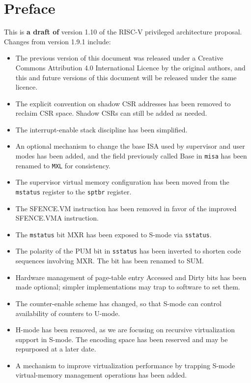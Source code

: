 \chapter{Preface}

This is {\bf a draft of} version 1.10 of the RISC-V privileged
architecture proposal.  Changes from version 1.9.1 include:

\begin{itemize}
  \parskip 0pt
  \itemsep 1pt
\item The previous version of this document was released under a
  Creative Commons Attribution 4.0 International Licence by the
  original authors, and this and future versions of this document will
  be released under the same licence.
\item The explicit convention on shadow CSR addresses has been removed to
  reclaim CSR space.  Shadow CSRs can still be added as needed.
\item The interrupt-enable stack discipline has been simplified.
\item An optional mechanism to change the base ISA used by supervisor
  and user modes has been added, and the field previously called Base
  in {\tt misa} has been renamed to {\tt MXL} for consistency.
\item The supervisor virtual memory configuration has been moved from the
  {\tt mstatus} register to the {\tt sptbr} register.
\item The SFENCE.VM instruction has been removed in favor of the improved
  SFENCE.VMA instruction.
\item The {\tt mstatus} bit MXR has been exposed to S-mode via {\tt sstatus}.
\item The polarity of the PUM bit in {\tt sstatus} has been inverted to
  shorten code sequences involving MXR.  The bit has been renamed to SUM.
\item Hardware management of page-table entry Accessed and Dirty bits has
  been made optional; simpler implementations may trap to software to
  set them.
\item The counter-enable scheme has changed, so that S-mode can
  control availability of counters to U-mode.
\item H-mode has been removed, as we are focusing on recursive
  virtualization support in S-mode.  The encoding space has been
  reserved and may be repurposed at a later date.
\item A mechanism to improve virtualization performance by
  trapping S-mode virtual-memory management operations has been added.
\end{itemize}

